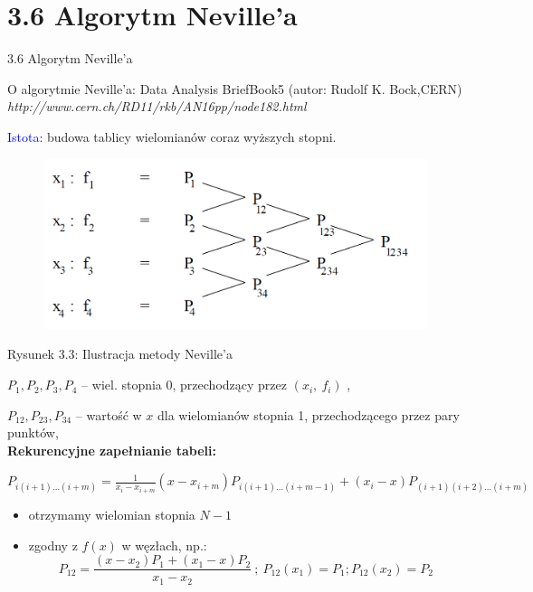 \section{3.6 Algorytm Neville'a}
\begin{frame}
{3.6 Algorytm Neville'a}

O algorytmie Neville'a: Data Analysis BriefBook5 (autor: Rudolf K. Bock,CERN)
{\it http://www.cern.ch/RD11/rkb/AN16pp/node182.html} \newline

\textcolor{blue}{Istota:} budowa tablicy wielomianów coraz wyższych stopni.
\begin{figure}[h]
			\includegraphics[scale = 0.28]{img/3/interpol_3_6}
	\end{figure}
Rysunek 3.3: Ilustracja metody Neville'a
\end{frame}

\begin{frame}
$P_{1}, P_{2}, P_{3}, P_{4}$ -- wiel. stopnia $0$, przechodzący przez $(x_{i},\ f_{i})$ ,

$P_{12}, P_{23}, P_{34}$ -- wartość w $x$ dla wielomianów stopnia 1, przechodzącego przez pary punktów, \\
\vspace{4mm}
\textbf{Rekurencyjne zapełnianie tabeli:}

$P_{i(i+1)\ldots(i+m)}=\displaystyle \frac{1}{x_{i}-x_{i+m}}(x-x_{i+m})P_{i(i+1)\ldots(i+m-1)}+(x_{i}-x)P_{(i+1)(i+2)\ldots(i+m)}$

\begin{itemize}
\item otrzymamy wielomian stopnia $N-1$

\item zgodny z $f(x)$ w węzłach, np.:
$$
P_{12}=\frac{(x-x_{2})P_{1}+(x_{1}-x)P_{2}}{x_{1}-x_{2}}\ ;\ P_{12}(x_{1})=P_{1};P_{12}(x_{2})=P_{2}
$$

\end{itemize}

\end{frame}

